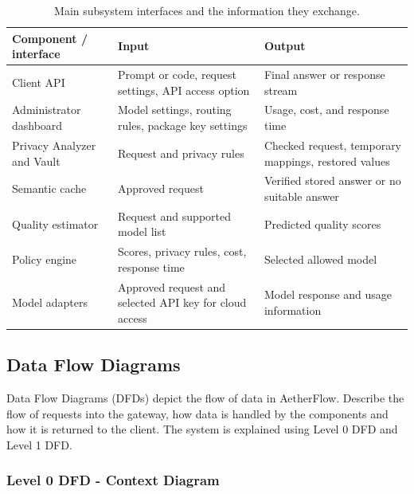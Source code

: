 \documentclass{FastFyp}
\begin{document}
\begin{table}[!htbp]
\centering\small
\caption{Main subsystem interfaces and the information they exchange.}
\label{tab:interfaces}
\begin{tabularx}{\textwidth}{|P{3.4cm}|X|X|}\hline
\textbf{Component / interface} & \textbf{Input} & \textbf{Output}\\\hline
Client API & Prompt or code, request settings, API access option & Final answer or response stream\\\hline
Administrator dashboard & Model settings, routing rules, package key settings & Usage, cost, and response time\\\hline
Privacy Analyzer and Vault & Request and privacy rules & Checked request, temporary mappings, restored values\\\hline
Semantic cache & Approved request & Verified stored answer or no suitable answer\\\hline
Quality estimator & Request and supported model list & Predicted quality scores\\\hline
Policy engine & Scores, privacy rules, cost, response time & Selected allowed model\\\hline
Model adapters & Approved request and selected API key for cloud access & Model response and usage information\\\hline
\end{tabularx}

\end{table}

\subsection{Data Flow Diagrams}
\label{sec:data_flow_diagrams}

Data Flow Diagrams (DFDs) depict the flow of data in AetherFlow. Describe the flow of requests into the gateway, how data is handled by the components and how it is returned to the client. The system is explained using Level 0 DFD and Level 1 DFD.

\subsubsection{Level 0 DFD - Context Diagram}
\label{sec:dfd_level0}
\end{document}
